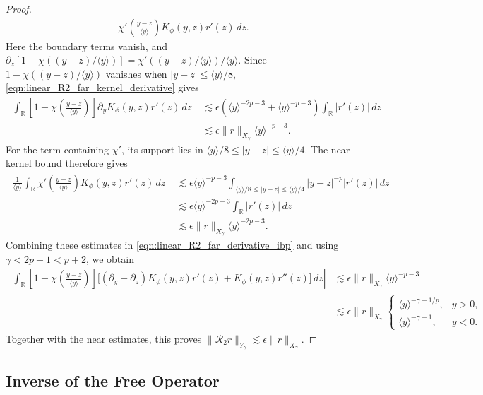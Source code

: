 \documentclass[11pt]{amsart}
\theoremstyle{definition}
\theoremstyle{remark}
\numberwithin{equation}{section}
\newcommand{\R}{\mathbb{R}}
\newcommand{\mc}[1]{\mathcal{#1}}
\newcommand{\ang}[1]{\langle #1 \rangle}
\begin{document}
\begin{proof}
\begin{equation}
\begin{aligned}
    \chi'\left(\frac{y-z}{\ang{y}}\right)K_\phi(y,z)r'(z)\,dz.
\end{aligned}
\end{equation}
Here the boundary terms vanish, and $\partial_z[1-\chi((y-z)/\ang{y})]=\chi'((y-z)/\ang{y})/\ang{y}$. Since $1-\chi((y-z)/\ang{y})$ vanishes when $|y-z|\leq\ang{y}/8$, \eqref{eqn:linear_R2_far_kernel_derivative} gives
\begin{align*}
    \left|\int_{\R}\left[1-\chi\left(\frac{y-z}{\ang{y}}\right)\right]\partial_yK_\phi(y,z)r'(z)\,dz\right| & \lesssim \epsilon\left(\ang{y}^{-2p-3}+\ang{y}^{-p-3}\right)\int_{\R}|r'(z)|\,dz\\
    & \lesssim \epsilon\|r\|_{X_\gamma}\ang{y}^{-p-3}.
\end{align*}
For the term containing $\chi'$, its support lies in $\ang{y}/8\leq|y-z|\leq\ang{y}/4$. The near kernel bound therefore gives
\begin{align*}
    \left|\frac{1}{\ang{y}}\int_{\R}\chi'\left(\frac{y-z}{\ang{y}}\right)K_\phi(y,z)r'(z)\,dz\right| & \lesssim \epsilon\ang{y}^{-p-3}\int_{\ang{y}/8\leq|y-z|\leq\ang{y}/4}|y-z|^{-p}|r'(z)|\,dz\\
    & \lesssim \epsilon\ang{y}^{-2p-3}\int_{\R}|r'(z)|\,dz\\
    & \lesssim \epsilon\|r\|_{X_\gamma}\ang{y}^{-2p-3}.
\end{align*}
Combining these estimates in \eqref{eqn:linear_R2_far_derivative_ibp} and using $\gamma<2p+1<p+2$, we obtain
\begin{align*}
    \left|\int_{\R}\left[1-\chi\left(\frac{y-z}{\ang{y}}\right)\right]\bigl[(\partial_y+\partial_z)K_\phi(y,z)r'(z)+K_\phi(y,z)r''(z)\bigr]\,dz\right| & \lesssim \epsilon\|r\|_{X_\gamma}\ang{y}^{-p-3}\\
    & \lesssim \epsilon\|r\|_{X_\gamma}\begin{cases}
        \ang{y}^{-\gamma+1/p}, & y>0,\\
        \ang{y}^{-\gamma-1}, & y<0.
    \end{cases}
\end{align*}
Together with the near estimates, this proves $\|\mc{R}_2r\|_{Y_\gamma}\lesssim\epsilon\|r\|_{X_\gamma}$.
\end{proof}

\subsection{Inverse of the Free Operator}
\end{document}

